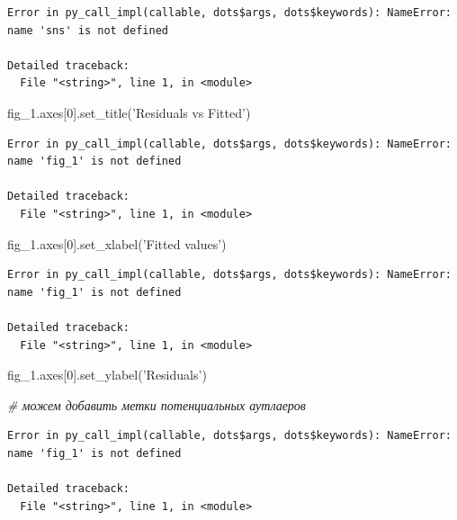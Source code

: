 \documentclass[]{book}
\newenvironment{Shaded}{\begin{snugshade}}{\end{snugshade}}
\newcommand{\CommentTok}[1]{\textcolor[rgb]{0.56,0.35,0.01}{\textit{#1}}}
\newcommand{\DecValTok}[1]{\textcolor[rgb]{0.00,0.00,0.81}{#1}}
\newcommand{\NormalTok}[1]{#1}
\newcommand{\StringTok}[1]{\textcolor[rgb]{0.31,0.60,0.02}{#1}}
\begin{document}
\begin{verbatim}
Error in py_call_impl(callable, dots$args, dots$keywords): NameError: name 'sns' is not defined

Detailed traceback: 
  File "<string>", line 1, in <module>
\end{verbatim}

\begin{Shaded}
\begin{Highlighting}[]
\NormalTok{fig_1.axes[}\DecValTok{0}\NormalTok{].set_title(}\StringTok{'Residuals vs Fitted'}\NormalTok{)}
\end{Highlighting}
\end{Shaded}

\begin{verbatim}
Error in py_call_impl(callable, dots$args, dots$keywords): NameError: name 'fig_1' is not defined

Detailed traceback: 
  File "<string>", line 1, in <module>
\end{verbatim}

\begin{Shaded}
\begin{Highlighting}[]
\NormalTok{fig_1.axes[}\DecValTok{0}\NormalTok{].set_xlabel(}\StringTok{'Fitted values'}\NormalTok{)}
\end{Highlighting}
\end{Shaded}

\begin{verbatim}
Error in py_call_impl(callable, dots$args, dots$keywords): NameError: name 'fig_1' is not defined

Detailed traceback: 
  File "<string>", line 1, in <module>
\end{verbatim}

\begin{Shaded}
\begin{Highlighting}[]
\NormalTok{fig_1.axes[}\DecValTok{0}\NormalTok{].set_ylabel(}\StringTok{'Residuals'}\NormalTok{)}


\CommentTok{# можем добавить метки потенциальных аутлаеров}
\end{Highlighting}
\end{Shaded}

\begin{verbatim}
Error in py_call_impl(callable, dots$args, dots$keywords): NameError: name 'fig_1' is not defined

Detailed traceback: 
  File "<string>", line 1, in <module>
\end{verbatim}
\end{document}
